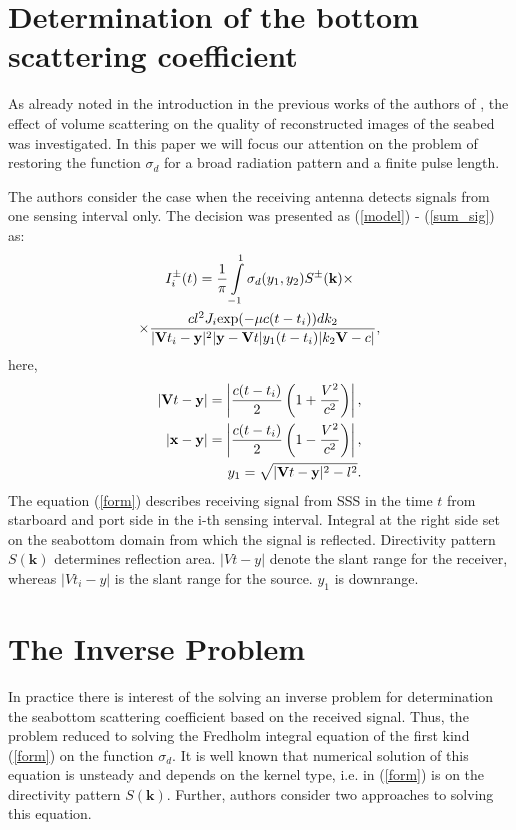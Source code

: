\documentclass{procDDs}
\begin{document}
\section{Determination of the bottom scattering coefficient}


As already noted in the introduction in the previous works of the authors of \cite{AF2015, SPIE_KOV}, the effect of volume scattering on the quality of reconstructed images of the seabed was investigated. In this paper we will focus our attention on the problem of restoring the  function $\sigma_d$ for a broad radiation pattern and a finite pulse length.

The authors consider the case when the receiving antenna detects signals from one sensing interval only. The decision was presented as (\ref{model}) - (\ref{sum_sig}) as:
\begin{multline}
	\label{form}
	I^\pm_i(t) = \frac{1}{\pi}\int\limits_{-1}^{1}\sigma_d(y_1,y_2) S^{\pm}(\mathbf{k}) \times \\ \times
	\frac{ cl^2J_i \text{exp}(-\mu c(t-t_i))dk_2}{|\mathbf{V}t_i-\mathbf{y}|^2|\mathbf{y}-\mathbf{V}t|y_1(t-t_i)|k_2 \mathbf{V}-c|},
\end{multline}
here, 
\begin{align*}
	|\mathbf{V}t - \mathbf{y}| = \left|\dfrac{c(t-t_i)}{2}\left(1+\dfrac{V^2}{c^2}\right) \right|, \\
	|\mathbf{x}-\mathbf{y}| = \left|\dfrac{c(t-t_i)}{2}\left(1-\dfrac{V^2}{c^2}\right) \right|, \\
	y_1 = \sqrt{|\mathbf{V}t-\mathbf{y}|^2 - l^2}.
\end{align*}
The equation (\ref{form}) describes receiving signal from SSS in the time $t$ from starboard and port side in the i-th sensing interval. Integral at the right side set on the seabottom domain from which the signal is reflected. Directivity pattern $S(\textbf{k})$ determines reflection area. $|Vt-y|$ denote the slant range for the receiver, whereas $|Vt_i-y|$   is the slant range for the source. $y_1$ is downrange.

\section{The Inverse Problem}
In practice there is interest of the solving an inverse problem for determination the seabottom scattering coefficient based on the received signal. Thus, the problem reduced to solving the Fredholm integral equation of the first kind (\ref{form}) on the function $\sigma_d$. It is well known that numerical solution of this equation is unsteady and depends on the kernel type, i.e. in (\ref{form}) is on the directivity pattern $S(\textbf{k})$. Further, authors consider two approaches to solving this equation.
\end{document}
